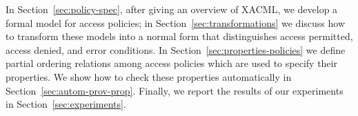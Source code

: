In Section~\ref{sec:policy-spec}, after giving an overview of XACML,
we develop a formal model for access policies; in
Section~\ref{sec:transformations} we discuss how to transform these
models into a normal form that distinguishes access permitted, access
denied, and error conditions.  In
Section~\ref{sec:properties-policies} we define partial ordering
relations among access policies which are used to specify their
properties.  We show how to check these properties automatically in
Section~\ref{sec:autom-prov-prop}.  Finally, we report the results of
our experiments in Section~\ref{sec:experiments}.



